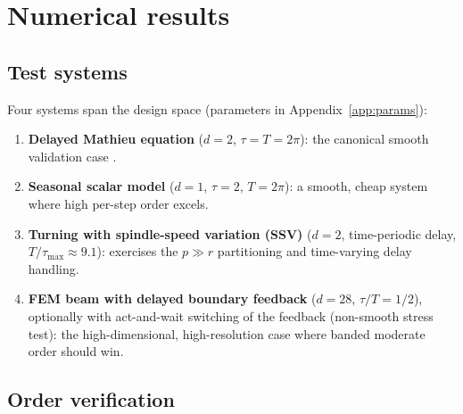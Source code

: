 \documentclass[Afour,sageh,times]{sagej}
\begin{document}
\section{Numerical results}
\label{sec:results}

\subsection{Test systems}
\label{sec:systems}

Four systems span the design space (parameters in
Appendix~\ref{app:params}):
\begin{enumerate}
  \item \textbf{Delayed Mathieu equation} ($d=2$, $\tau = T = 2\pi$): the
        canonical smooth validation case \citep{Insperger2011}.
  \item \textbf{Seasonal scalar model} ($d=1$, $\tau = 2$, $T=2\pi$): a
        smooth, cheap system where high per-step order excels.
  \item \textbf{Turning with spindle-speed variation (SSV)} ($d=2$,
        time-periodic delay, $T/\tau_{\max} \approx 9.1$): exercises the
        $p \gg r$ partitioning and time-varying delay handling.
  \item \textbf{FEM beam with delayed boundary feedback} ($d=28$,
        $\tau/T = 1/2$), optionally with act-and-wait switching of the
        feedback \citep{Insperger2006aw} (non-smooth stress test): the high-dimensional,
        high-resolution case where banded moderate order should win.
\end{enumerate}

\subsection{Order verification}
\label{sec:order}
\end{document}
